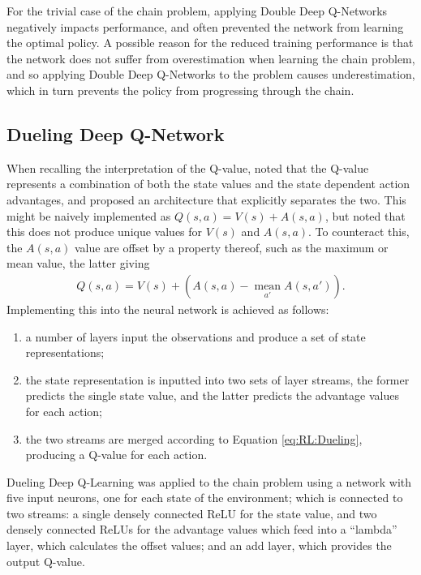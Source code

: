 For the trivial case of the chain problem, applying Double Deep Q-Networks
negatively impacts performance, and often prevented the network from learning
the optimal policy.
A possible reason for the reduced training performance is that the network does
not suffer from overestimation when learning the chain problem, and so applying
Double Deep Q-Networks to the problem causes underestimation, which in turn
prevents the policy from progressing through the chain.



\subsection{Dueling Deep Q-Network}\label{sec:RL:Dueling}

When recalling the interpretation of the Q-value, \cite{Wang:2015:Dueling} noted
that the Q-value represents a combination of both the state values and the state
dependent action advantages, and proposed an architecture that explicitly
separates the two.
This might be naively implemented as $Q(s,a) = V(s) + A(s,a)$, but
\citeauthor{Wang:2015:Dueling} noted that this does not produce unique values
for $V(s)$ and $A(s,a)$.
To counteract this, the $A(s,a)$ value are offset by a property thereof, such as
the maximum or mean value, the latter giving
\begin{align}
    Q(s,a) = V(s) + \left(A(s,a) - \underset{a'}{\operatorname{mean}}A(s,a')\right).
    \label{eq:RL:Dueling}
\end{align}
Implementing this into the neural network is achieved as follows:
\begin{enumerate}
    \item a number of layers input the observations and produce a set of state
        representations;
    \item the state representation is inputted into two sets of layer streams,
        the former predicts the single state value, and the latter predicts the
        advantage values for each action;
    \item the two streams are merged according to Equation \ref{eq:RL:Dueling},
        producing a Q-value for each action.
\end{enumerate}


Dueling Deep Q-Learning was applied to the chain problem using a network with
five input neurons, one for each state of the environment; which is connected
to two streams: a single densely connected ReLU for the state value, and two
densely connected ReLUs for the advantage values which feed into a ``lambda''
layer, which calculates the offset values; and an add layer, which provides the
output Q-value.


